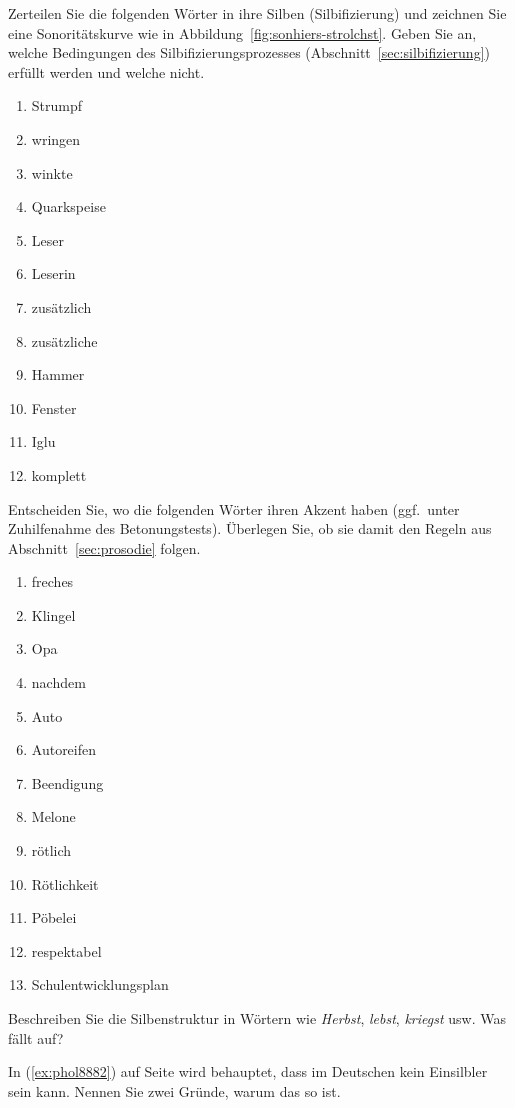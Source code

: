 \Uebung \label{u44} Zerteilen Sie die folgenden Wörter in ihre Silben (Silbifizierung) und zeichnen Sie eine Sonoritätskurve wie in Abbildung~\ref{fig:sonhiers-strolchst}.
Geben Sie an, welche Bedingungen des Silbifizierungsprozesses (Abschnitt~\ref{sec:silbifizierung}) erfüllt werden und welche nicht.

\begin{enumerate}\Lf
  \item Strumpf
  \item wringen
  \item winkte
  \item Quarkspeise
  \item Leser
  \item Leserin
  \item zusätzlich
  \item zusätzliche
  \item Hammer
  \item Fenster
  \item Iglu
  \item komplett
\end{enumerate}

\Uebung \label{u45} Entscheiden Sie, wo die folgenden Wörter ihren Akzent haben (ggf.\ unter Zuhilfenahme des Betonungstests).
Überlegen Sie, ob sie damit den Regeln aus Abschnitt~\ref{sec:prosodie} folgen.

\begin{enumerate}\Lf
  \item freches
  \item Klingel
  \item Opa
  \item nachdem
  \item Auto
  \item Autoreifen
  \item Beendigung
  \item Melone
  \item rötlich
  \item Rötlichkeit
  \item Pöbelei
  \item respektabel
  \item Schulentwicklungsplan
\end{enumerate}

\Uebung[\tristar] \label{u46} Beschreiben Sie die Silbenstruktur in Wörtern wie \textit{Herbst}, \textit{lebst}, \textit{kriegst} usw.
Was fällt auf?

\Uebung[\tristar] \label{u47} In (\ref{ex:phol8882}) auf Seite \pageref{ex:phol8882} wird behauptet, dass \textipa{[s5]} im Deutschen kein Einsilbler sein kann.
Nennen Sie zwei Gründe, warum das so ist.

